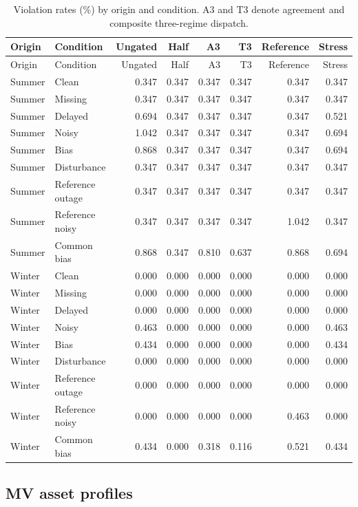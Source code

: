\documentclass[11pt]{article}
\begin{document}
\small\begin{longtable}{llrrrrrr}
\caption{Violation rates (\%) by origin and condition. A3 and T3 denote agreement and composite three-regime dispatch.}\\\toprule
Origin & Condition & Ungated & Half & A3 & T3 & Reference & Stress\\\midrule
\endfirsthead
\toprule
Origin & Condition & Ungated & Half & A3 & T3 & Reference & Stress\\\midrule
\endhead
\bottomrule\endfoot
Summer & Clean & 0.347 & 0.347 & 0.347 & 0.347 & 0.347 & 0.347\\
Summer & Missing & 0.347 & 0.347 & 0.347 & 0.347 & 0.347 & 0.347\\
Summer & Delayed & 0.694 & 0.347 & 0.347 & 0.347 & 0.347 & 0.521\\
Summer & Noisy & 1.042 & 0.347 & 0.347 & 0.347 & 0.347 & 0.694\\
Summer & Bias & 0.868 & 0.347 & 0.347 & 0.347 & 0.347 & 0.694\\
Summer & Disturbance & 0.347 & 0.347 & 0.347 & 0.347 & 0.347 & 0.347\\
Summer & Reference outage & 0.347 & 0.347 & 0.347 & 0.347 & 0.347 & 0.347\\
Summer & Reference noisy & 0.347 & 0.347 & 0.347 & 0.347 & 1.042 & 0.347\\
Summer & Common bias & 0.868 & 0.347 & 0.810 & 0.637 & 0.868 & 0.694\\
Winter & Clean & 0.000 & 0.000 & 0.000 & 0.000 & 0.000 & 0.000\\
Winter & Missing & 0.000 & 0.000 & 0.000 & 0.000 & 0.000 & 0.000\\
Winter & Delayed & 0.000 & 0.000 & 0.000 & 0.000 & 0.000 & 0.000\\
Winter & Noisy & 0.463 & 0.000 & 0.000 & 0.000 & 0.000 & 0.463\\
Winter & Bias & 0.434 & 0.000 & 0.000 & 0.000 & 0.000 & 0.434\\
Winter & Disturbance & 0.000 & 0.000 & 0.000 & 0.000 & 0.000 & 0.000\\
Winter & Reference outage & 0.000 & 0.000 & 0.000 & 0.000 & 0.000 & 0.000\\
Winter & Reference noisy & 0.000 & 0.000 & 0.000 & 0.000 & 0.463 & 0.000\\
Winter & Common bias & 0.434 & 0.000 & 0.318 & 0.116 & 0.521 & 0.434\\
\end{longtable}\normalsize
{}\subsection{MV asset profiles}
\end{document}
